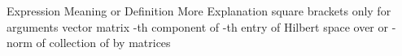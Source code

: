 \page [yes] %


{\tfx
\starttable[|l|l|l|] \HL
\NC Expression \VL Meaning or Definition \VL More Explanation \SR \HL
\NC {} \VL square brackets \VL only for arguments \AR \HL
\NC {} \VL vector \VL  \AR \HL
\NC {} \VL matrix \VL  \AR \HL
\NC {} \VL {}-th component of  \VL  \AR \HL
\NC {} \VL {}-th entry of  \VL  \AR \HL
\NC {} \VL Hilbert space  over  \VL {} or  \AR \HL
\NC {} \VL {}-norm of  \VL {} \AR \HL
\NC {} \VL collection of  by  matrices \VL  \AR \HL
\stoptable
}

\page[yes] %

